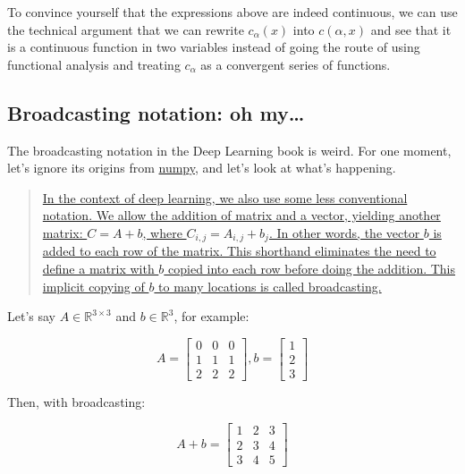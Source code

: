 \documentclass[]{scrartcl}
\begin{document}
To convince yourself that the expressions above are indeed continuous,
we can use the technical argument that we can rewrite
\(c_\alpha \left (x \right )\) into \(c \left (\alpha, x \right )\) and
see that it is a continuous function in two variables instead of going
the route of using functional analysis and treating \(c_\alpha\) as a
convergent series of functions.

\subsection{Broadcasting notation: oh
my\ldots{}}\label{broadcasting-notation-oh-my}

The broadcasting notation in the Deep Learning book is weird. For one
moment, let's ignore its origins from
\href{https://docs.scipy.org/doc/numpy-1.10.1/user/basics.broadcasting.html}{numpy},
and let's look at what's happening.

\begin{quote}
\href{http://www.deeplearningbook.org/contents/linear_algebra.html\#pf4}{In
the context of deep learning, we also use some less conventional
notation. We allow the addition of matrix and a vector, yielding another
matrix: \(C=A+b\), where \(C_{i,j}=A_{i,j}+b_j\). In other words, the
vector \(b\) is added to each row of the matrix. This shorthand
eliminates the need to deﬁne a matrix with \(b\) copied into each row
before doing the addition. This implicit copying of \(b\) to many
locations is called broadcasting.}
\end{quote}

Let's say \(A \in \mathbb{R}^{3 \times 3}\) and \(b \in \mathbb{R}^3\),
for example:

\[ A = \left[\begin{matrix}0 & 0 & 0\\1 & 1 & 1\\2 & 2 & 2\end{matrix}\right] , b = \left[\begin{matrix}1\\2\\3\end{matrix}\right] \]

Then, with broadcasting:

\[ A + b = \left[\begin{matrix}1 & 2 & 3\\2 & 3 & 4\\3 & 4 & 5\end{matrix}\right] \]
\end{document}
